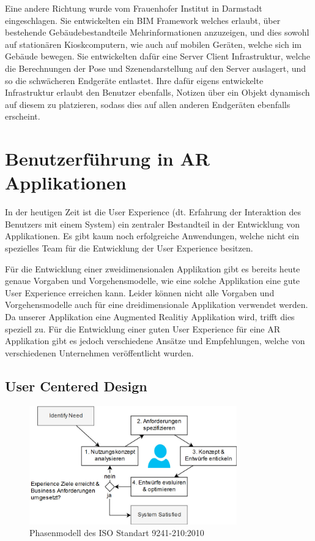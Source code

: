 \documentclass[a4paper]{scrreprt}
\begin{document}
Eine andere Richtung wurde vom Frauenhofer Institut in Darmstadt \parencite{Olbrich2013} eingeschlagen. Sie entwickelten ein BIM Framework welches erlaubt, über bestehende Gebäudebestandteile Mehrinformationen anzuzeigen, und dies sowohl auf stationären Kioskcomputern, wie auch auf mobilen Geräten, welche sich im Gebäude bewegen. Sie entwickelten dafür eine Server Client Infrastruktur, welche die Berechnungen der Pose und Szenendarstellung auf den Server auslagert, und so die schwächeren Endgeräte entlastet. Ihre dafür eigens entwickelte Infrastruktur erlaubt den Benutzer ebenfalls, Notizen über ein Objekt dynamisch auf diesem zu platzieren, sodass dies auf allen anderen Endgeräten ebenfalls erscheint.

\section{Benutzerführung in AR Applikationen}
In der heutigen Zeit ist die User Experience (dt. Erfahrung der Interaktion des Benutzers mit einem System) ein zentraler Bestandteil in der Entwicklung von Applikationen. Es gibt kaum noch erfolgreiche Anwendungen, welche nicht ein spezielles Team für die Entwicklung der User Experience besitzen.

Für die Entwicklung einer zweidimensionalen Applikation gibt es bereits heute genaue Vorgaben und Vorgehensmodelle, wie eine solche Applikation eine gute User Experience erreichen kann. Leider können nicht alle Vorgaben und Vorgehensmodelle auch für eine dreidimensionale Applikation verwendet werden. Da unserer Applikation eine Augmented Realitiy Applikation wird, trifft dies speziell zu.
Für die Entwicklung einer guten User Experience für eine AR Applikation gibt es jedoch verschiedene Ansätze und Empfehlungen, welche von verschiedenen Unternehmen veröffentlicht wurden. 

\subsection{User Centered Design}
\begin{figure}[h!]
	\centering
	\includegraphics[keepaspectratio,width=0.8\textwidth]{UserCenteredDesign}
	\caption{Phasenmodell des ISO Standart 9241-210:2010 \parencite{ISO9241}}
\end{figure}
\end{document}
